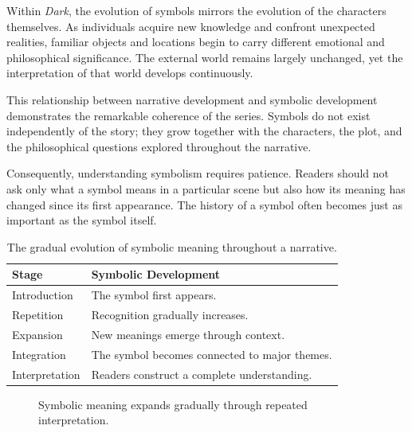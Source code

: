 \documentclass[12pt,oneside,openany]{book}
\begin{document}
Within \textit{Dark}, the evolution of symbols mirrors the evolution of the
characters themselves. As individuals acquire new knowledge and confront
unexpected realities, familiar objects and locations begin to carry different
emotional and philosophical significance. The external world remains largely
unchanged, yet the interpretation of that world develops continuously.

This relationship between narrative development and symbolic development
demonstrates the remarkable coherence of the series. Symbols do not exist
independently of the story; they grow together with the characters, the plot,
and the philosophical questions explored throughout the narrative.

Consequently, understanding symbolism requires patience. Readers should not ask
only what a symbol means in a particular scene but also how its meaning has
changed since its first appearance. The history of a symbol often becomes just
as important as the symbol itself.

\begin{table}[H]
\centering
\begin{tabular}{|p{4.3cm}|p{7.7cm}|}
\hline
\textbf{Stage} & \textbf{Symbolic Development}\\
\hline
Introduction & The symbol first appears.\\
\hline
Repetition & Recognition gradually increases.\\
\hline
Expansion & New meanings emerge through context.\\
\hline
Integration & The symbol becomes connected to major themes.\\
\hline
Interpretation & Readers construct a complete understanding.\\
\hline
\end{tabular}
\caption{The gradual evolution of symbolic meaning throughout a narrative.}
\end{table}

\begin{figure}[H]
\centering
{}

\caption{Symbolic meaning expands gradually through repeated interpretation.}
\end{figure}
\end{document}
